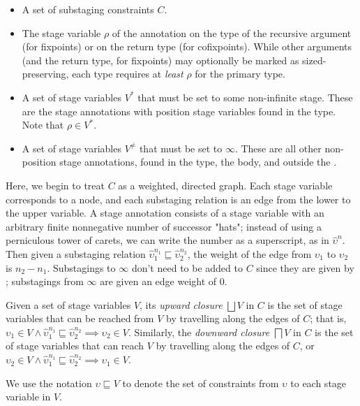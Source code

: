 \documentclass[acmsmall,screen,review,10pt]{acmart} %
\begin{document}
\begin{itemize}
    \item A set of substaging constraints $C$.
    \item The stage variable $\rho$ of the annotation on the type of the recursive argument (for fixpoints) or on the return type (for cofixpoints). While other arguments (and the return type, for fixpoints) may optionally be marked as sized-preserving, each \cofixpoint type requires at \textit{least} $\rho$ for the primary \corecursive type.
    \item A set of stage variables $V^*$ that must be set to some non-infinite stage. These are the stage annotations with position stage variables found in the \cofixpoint type. Note that $\rho \in V^*$.
    \item A set of stage variables $V^\neq$ that must be set to $\infty$. These are all other non-position stage annotations, found in the \cofixpoint type, the \cofixpoint body, and outside the \cofixpoint.
\end{itemize}

Here, we begin to treat $C$ as a weighted, directed graph. Each stage variable corresponds to a node, and each substaging relation is an edge from the lower to the upper variable. A stage annotation consists of a stage variable with an arbitrary finite nonnegative number of successor "hats"; instead of using a perniculous tower of carets, we can write the number as a superscript, as in $\hat{\upsilon}^n$. Then given a substaging relation $\hat{\upsilon}_1^{n_1} \sqsubseteq \hat{\upsilon}_2^{n_2}$, the weight of the edge from $\upsilon_1$ to $\upsilon_2$ is $n_2 - n_1$. Substagings to $\infty$ don't need to be added to $C$ since they are given by ; substagings from $\infty$ are given an edge weight of $0$.

Given a set of stage variables $V$, its \textit{upward closure} $\bigsqcup V$ in $C$ is the set of stage variables that can be reached from $V$ by travelling along the edges of $C$; that is, $\upsilon_1 \in V \wedge \hat{\upsilon}_1^{n_1} \sqsubseteq \hat{\upsilon}_2^{n_2} \implies \upsilon_2 \in V$. Similarly, the \textit{downward closure} $\bigsqcap V$ in $C$ is the set of stage variables that can reach $V$ by travelling along the edges of $C$, or $\upsilon_2 \in V \wedge \hat{\upsilon}_1^{n_1} \sqsubseteq \hat{\upsilon}_2^{n_2} \implies \upsilon_1 \in V$.

We use the notation $\upsilon \sqsubseteq V$ to denote the set of constraints from $\upsilon$ to each stage variable in $V$.
\end{document}
